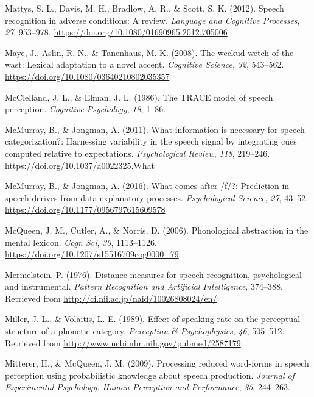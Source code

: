 \documentclass[
  11pt,
  english,
  man,floatsintext]{apa6}
\newlength{\cslhangindent}
\newlength{\cslentryspacingunit} %
\newenvironment{CSLReferences}[2] %
 {%
  \setlength{\parindent}{0pt}
  \ifodd #1
  \let\oldpar\par
  \def\par{\hangindent=\cslhangindent\oldpar}
  \fi
  \setlength{\parskip}{#2\cslentryspacingunit}
 }%
 {}
\begin{document}
\begin{CSLReferences}{1}{0}
\leavevmode{}%
Mattys, S. L., Davis, M. H., Bradlow, A. R., \& Scott, S. K. (2012). Speech recognition in adverse conditions: A review. \emph{Language and Cognitive Processes}, \emph{27}, 953--978. \url{https://doi.org/10.1080/01690965.2012.705006}

\leavevmode{}%
Maye, J., Aslin, R. N., \& Tanenhaus, M. K. (2008). The weckud wetch of the wast: Lexical adaptation to a novel accent. \emph{Cognitive Science}, \emph{32}, 543--562. \url{https://doi.org/10.1080/03640210802035357}

\leavevmode{}%
McClelland, J. L., \& Elman, J. L. (1986). The TRACE model of speech perception. \emph{Cognitive Psychology}, \emph{18}, 1--86.

\leavevmode{}%
McMurray, B., \& Jongman, A. (2011). What information is necessary for speech categorization?: Harnessing variability in the speech signal by integrating cues computed relative to expectations. \emph{Psychological Review}, \emph{118}, 219--246. \url{https://doi.org/10.1037/a0022325.What}

\leavevmode{}%
McMurray, B., \& Jongman, A. (2016). What comes after /f/?: Prediction in speech derives from data-explanatory processes. \emph{Psychological Science}, \emph{27}, 43--52. \url{https://doi.org/10.1177/0956797615609578}

\leavevmode{}%
McQueen, J. M., Cutler, A., \& Norris, D. (2006). Phonological abstraction in the mental lexicon. \emph{Cogn Sci}, \emph{30}, 1113--1126. \url{https://doi.org/10.1207/s15516709cog0000_79}

\leavevmode{}%
Mermelstein, P. (1976). Distance measures for speech recognition, psychological and instrumental. \emph{Pattern Recognition and Artificial Intelligence}, 374--388. Retrieved from \url{http://ci.nii.ac.jp/naid/10026808024/en/}

\leavevmode{}%
Miller, J. L., \& Volaitis, L. E. (1989). Effect of speaking rate on the perceptual structure of a phonetic category. \emph{Perception \& Psychophysics}, \emph{46}, 505--512. Retrieved from \url{http://www.ncbi.nlm.nih.gov/pubmed/2587179}

\leavevmode{}%
Mitterer, H., \& McQueen, J. M. (2009). Processing reduced word-forms in speech perception using probabilistic knowledge about speech production. \emph{Journal of Experimental Psychology: Human Perception and Performance}, \emph{35}, 244--263.


\end{CSLReferences}
\end{document}
